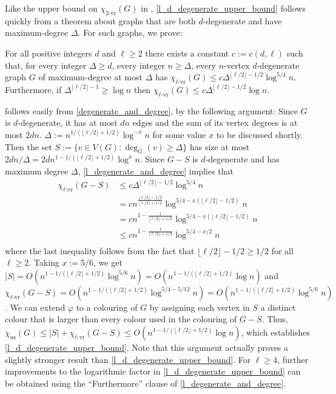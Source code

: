 \documentclass{patmorin}
\newcommand{\rn}[1]{\chi_{\operatorname{#1-vr}}}
\newcommand{\trn}{\chi_{\mathrm{us}}}
\newcommand{\lrn}{\rn{\ell}}
\newcommand{\texp}{1-1/(\lfloor\ell/2\rfloor+1/2)}
\newcommand{\dexp}{1-\frac{1}{\lfloor\ell/2\rfloor+1/2}}
\begin{document}
Like the upper bound on $\rn{2}(G)$ in \cite{karpas.neiman.ea:on}, \cref{l_d_degenerate_upper_bound} follows quickly from a theorem about graphs that are both $d$-degenerate and have maximum-degree $\Delta$. For such graphs, we prove:

\begin{thm}\label{degenerate_and_degree}
  For all positive integers $d$ and $\ell\ge 2$ there exists a constant $c:=c(d,\ell)$ such that, for every integer $\Delta\ge d$, every integer $n\ge \Delta$, every $n$-vertex $d$-degenerate graph $G$ of maximum-degree at most $\Delta$ has $\lrn(G)\le c\Delta^{\lfloor\ell/2\rfloor-1/2}\log^{5/4} n$.  Furthermore, if $\Delta^{\lfloor\ell/2\rfloor-1}\ge\log n$ then $\lrn(G)\le c\Delta^{\lfloor\ell/2\rfloor-1/2}\log n$.
\end{thm}

 follows easily from \cref{degenerate_and_degree}, by the following argument:  Since $G$ is $d$-degenerate, it has at most $dn$ edges and the sum of its vertex degrees is at most $2dn$.  $\Delta:=n^{1/(\lfloor\ell/2\rfloor+1/2)}\log^{-x} n$ for some value $x$ to be discussed shortly.  Then the set $S:=\{v\in V(G):\deg_G(v)\ge \Delta\}$ has size at most $2dn/\Delta=2dn^{\texp}\log^x n$.  Since $G-S$ is $d$-degenerate and has maximum degree $\Delta$, \cref{l_degenerate_and_degree} implies that
\begin{align*}
  \lrn(G-S) &
  \le c\Delta^{\lfloor\ell/2\rfloor-1/2}\log^{5/4} n \\
  & = cn^{\frac{\lfloor\ell/2\rfloor-1/2}{\lfloor\ell/2\rfloor+1/2}}\log^{5/4-x(\lfloor\ell/2\rfloor-1/2)} n \\
  & = cn^{\dexp}\log^{5/4-x(\lfloor\ell/2\rfloor-1/2)} n \\
  & \le cn^{\dexp}\log^{5/4-x/2} n \\
\end{align*}
where the last inequality follows from the fact that $\lfloor\ell/2\rfloor-1/2\ge 1/2$ for all $\ell\ge 2$.  Taking $x:=5/6$, we get $|S|=O(n^{\texp}\log^{5/6} n)=O(n^{\texp}\log n)$ and  $\lrn(G-S)= O(n^{\texp}\log^{5/4-5/12} n)
= O(n^{\texp}\log^{5/6} n)$.  We can extend $\varphi$ to a colouring of $G$ by assigning each vertex in $S$ a distinct colour that is larger than every colour used in the colouring of $G-S$.  Thus, $\trn(G)\le |S|+\lrn(G-S) \le O(n^{\texp}\log n)$, which establishes \cref{l_d_degenerate_upper_bound}.  Note that this argument actually proves a slightly stronger result than \cref{l_d_degenerate_upper_bound}.  For $\ell\ge 4$, further improvements to the logarithmic factor in \cref{l_d_degenerate_upper_bound} can be obtained using the ``Furthermore'' clause of \cref{l_degenerate_and_degree}.
\end{document}
